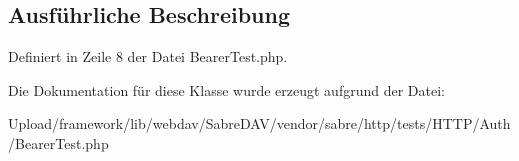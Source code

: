 \subsection{Ausführliche Beschreibung}


Definiert in Zeile 8 der Datei Bearer\+Test.\+php.



Die Dokumentation für diese Klasse wurde erzeugt aufgrund der Datei\+:\begin{DoxyCompactItemize}
\item 
Upload/framework/lib/webdav/\+Sabre\+D\+A\+V/vendor/sabre/http/tests/\+H\+T\+T\+P/\+Auth/Bearer\+Test.\+php\end{DoxyCompactItemize}
